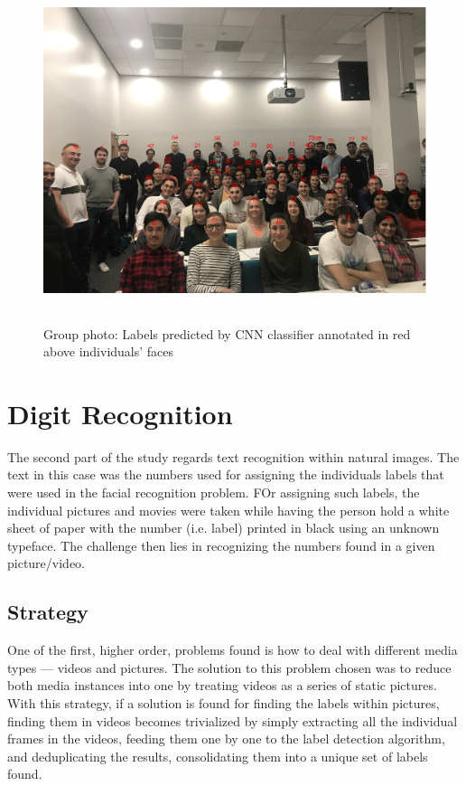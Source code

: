\documentclass[11pt]{article}
\begin{document}
        \begin{figure}[p]
            \centering
            \includegraphics[height=10cm]{./Images/results/annotated_group.png}
            \caption{Group photo: Labels predicted by CNN classifier annotated in red above individuals' faces}
            \label{fig:results:annotated_group}
        \end{figure}

\section{Digit Recognition}\label{sec:digit_ocr}

The second part of the study regards text recognition within natural images. The text in this case was the numbers used for assigning the individuals labels that were used in the facial recognition problem. FOr assigning such labels, the individual pictures and movies were taken while having the person hold a white sheet of paper with the number (i.e. label) printed in black using an unknown typeface. The challenge then lies in recognizing the numbers found in a given picture/video.

\subsection{Strategy}
    One of the first, higher order, problems found is how to deal with different media types --- videos and pictures. The solution to this problem chosen was to reduce both media instances into one by treating videos as a series of static pictures. With this strategy, if a solution is found for finding the labels within pictures, finding them in videos becomes trivialized by simply extracting all the individual frames in the videos, feeding them one by one to the label detection algorithm, and deduplicating the results, consolidating them into a unique set of labels found.
\end{document}
